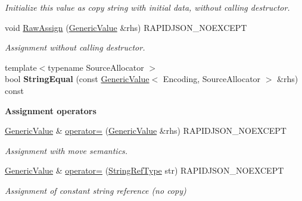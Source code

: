 \begin{DoxyCompactItemize}
\begin{DoxyCompactList}\small\item\em Initialize this value as copy string with initial data, without calling destructor. \end{DoxyCompactList}\item 
void \hyperlink{class_generic_value_abb8ea2dfbe74ff4ee7dac6be31317f81}{Raw\+Assign} (\hyperlink{class_generic_value}{Generic\+Value} \&rhs) R\+A\+P\+I\+D\+J\+S\+O\+N\+\_\+\+N\+O\+E\+X\+C\+E\+PT\hypertarget{class_generic_value_abb8ea2dfbe74ff4ee7dac6be31317f81}{}\label{class_generic_value_abb8ea2dfbe74ff4ee7dac6be31317f81}

\begin{DoxyCompactList}\small\item\em Assignment without calling destructor. \end{DoxyCompactList}\item 
{\footnotesize template$<$typename Source\+Allocator $>$ }\\bool {\bfseries String\+Equal} (const \hyperlink{class_generic_value}{Generic\+Value}$<$ Encoding, Source\+Allocator $>$ \&rhs) const \hypertarget{class_generic_value_a5ff908402687e14f5f14552ec58113a4}{}\label{class_generic_value_a5ff908402687e14f5f14552ec58113a4}

\end{DoxyCompactItemize}
\begin{Indent}{\bf Assignment operators}\par
\begin{DoxyCompactItemize}
\item 
\hyperlink{class_generic_value}{Generic\+Value} \& \hyperlink{class_generic_value_a9018a40d7c52efc00daf803c51d3236c}{operator=} (\hyperlink{class_generic_value}{Generic\+Value} \&rhs) R\+A\+P\+I\+D\+J\+S\+O\+N\+\_\+\+N\+O\+E\+X\+C\+E\+PT
\begin{DoxyCompactList}\small\item\em Assignment with move semantics. \end{DoxyCompactList}\item 
\hyperlink{class_generic_value}{Generic\+Value} \& \hyperlink{class_generic_value_a386708557555e6389184de608af5e6a6}{operator=} (\hyperlink{class_generic_value_a32e0f30ee278072374c8168b14d3317f}{String\+Ref\+Type} str) R\+A\+P\+I\+D\+J\+S\+O\+N\+\_\+\+N\+O\+E\+X\+C\+E\+PT
\begin{DoxyCompactList}\small\item\em Assignment of constant string reference (no copy) \end{DoxyCompactList}\end{DoxyCompactItemize}
\end{Indent}
